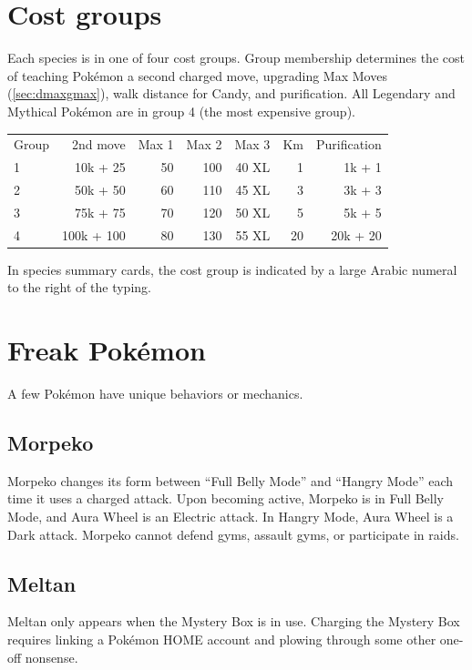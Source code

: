 \section{Cost groups}
\label{sec:costgroups}
Each species is in one of four cost groups.
Group membership determines the cost of teaching Pokémon a second charged move,
  upgrading Max Moves (\autoref{sec:dmaxgmax}),
  walk distance for Candy,
  and purification.
All Legendary and Mythical Pokémon are in group 4 (the most expensive group).
\begin{table}[ht]
  \centering
  \begin{tabular}{lrrrrrr}
    Group & 2nd move & Max 1 & Max 2 & Max 3 & Km & Purification\\
        1 & 10k + 25 & 50    & 100   & 40 XL & 1  & 1k + 1\\
        2 & 50k + 50 & 60    & 110   & 45 XL & 3  & 3k + 3\\
        3 & 75k + 75 & 70    & 120   & 50 XL & 5  & 5k + 5\\
        4 & 100k + 100 & 80  & 130   & 55 XL & 20 & 20k + 20\\
  \end{tabular}
\end{table}
In species summary cards, the cost group is indicated by a large Arabic
  numeral to the right of the typing.

\section{Freak Pokémon}
\label{sec:freaks}
A few Pokémon have unique behaviors or mechanics.

\subsection{Morpeko}
\label{subsec:morpeko}
Morpeko changes its form between ``Full Belly Mode'' and ``Hangry Mode''
  each time it uses a charged attack.
Upon becoming active, Morpeko is in Full Belly Mode, and Aura Wheel is an Electric attack.
In Hangry Mode, Aura Wheel is a Dark attack.
Morpeko cannot defend gyms, assault gyms, or participate in raids.

\subsection{Meltan}
\label{subsec:meltan}
Meltan only appears when the Mystery Box is in use.
Charging the Mystery Box requires linking a Pokémon HOME account and plowing through
  some other one-off nonsense.

